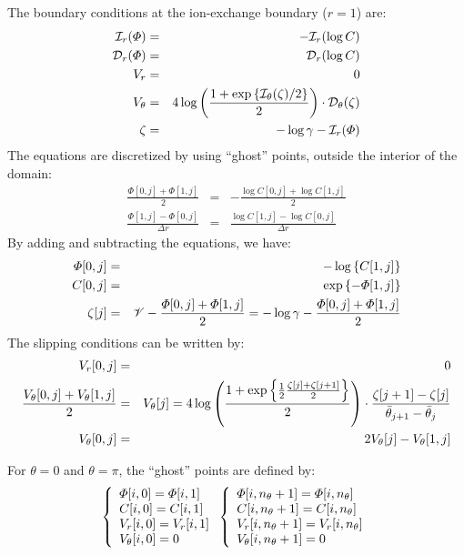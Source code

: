 The boundary conditions at the ion-exchange boundary ($r=1$) are:
\begin{eqnarray}
\cI_r(\varPhi) &=& -\cI_r(\log C) \\
\cD_r(\varPhi) &=& \cD_r(\log C) \\
V_r &=& 0 \\
V_\theta &=& 4\log\pars{\frac{1 + \exp\left\{\cI_\theta(\zeta)/2\right\}}{2}} \cdot 
			\cD_\theta(\zeta) \\
  \zeta &=& - \log \gamma - \cI_r(\varPhi)
\end{eqnarray}
The equations are discretized by using ``ghost'' points, outside the interior of the domain:
\begin{eqnarray}
  \frac{\varPhi[0,j] + \varPhi[1,j]}{2} &=& 
	-\frac{\log C[0,j] + \log C[1,j]}{2} \\
  \frac{\varPhi[1,j] - \varPhi[0,j]}{\Delta r} &=& 
	\frac{\log C[1,j] - \log C[0,j]}{\Delta r} 
\end{eqnarray}
By adding and subtracting the equations, we have:
\begin{eqnarray}
\varPhi[0,j] &=& -\log\brcs{C[1,j]} \\
C[0,j] &=& \exp\brcs{-\varPhi[1,j]} \\
  \zeta[j] &=& \cV -\frac{\varPhi[0,j] + \varPhi[1,j]}{2} 
                     = -\log\gamma -\frac{\varPhi[0,j] + \varPhi[1,j]}{2}
\end{eqnarray}
The slipping conditions can be written by:
\begin{eqnarray}
V_r[0,j] &=& 0 \\
\frac{V_\theta[0,j] + V_\theta[1,j]}{2} &=& V_\theta[j] = 
4\log\pars{\frac{1 + \exp\left\{\frac{1}{2}\frac{\zeta[j] + \zeta[j+1]}{2}\right\}}{2}} 
\cdot \frac{\zeta[j+1] - \zeta[j]}{\bar{\theta}_{j+1} - \bar{\theta}_{j}} \\
  V_\theta[0,j] &=& 2 V_\theta[j] - V_\theta[1,j]
\end{eqnarray}

For $\theta = 0$ and $\theta = \pi$, the ``ghost'' points are defined by:
\begin{eqnarray} 
\brc{l}{
\varPhi[i, 0] = \varPhi[i, 1] \\
C[i, 0] = C[i, 1] \\
V_r[i, 0] = V_r[i, 1] \\
V_\theta[i, 0] = 0
} 
\brc{l}{
\varPhi[i, n_\theta+1] = \varPhi[i, n_\theta] \\
C[i, n_\theta+1] = C[i, n_\theta] \\
V_r[i, n_\theta+1] = V_r[i, n_\theta] \\
V_\theta[i, n_\theta+1] = 0
} 
\end{eqnarray}

